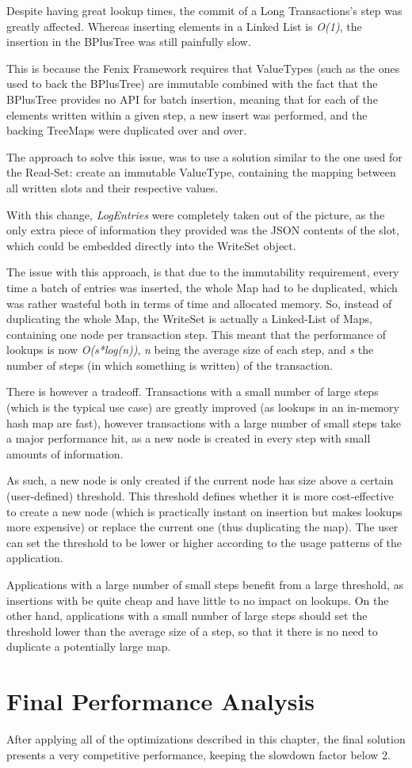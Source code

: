 Despite having great lookup times, the commit of a Long Transactions's
step was greatly affected. Whereas inserting elements in a Linked List
is {\it O(1)}, the insertion in the BPlusTree was still painfully
slow.

This is because the Fenix Framework requires that ValueTypes (such as
the ones used to back the BPlusTree) are immutable combined with the
fact that the BPlusTree provides no API for batch insertion, meaning
that for each of the elements written within a given step, a new
insert was performed, and the backing TreeMaps were duplicated over
and over. 

The approach to solve this issue, was to use a solution similar to the
one used for the Read-Set: create an immutable ValueType, containing
the mapping between all written slots and their respective values.

With this change, {\it LogEntries} were completely taken out of the
picture, as the only extra piece of information they provided was the
JSON contents of the slot, which could be embedded directly into the
WriteSet object.

The issue with this approach, is that due to the immutability
requirement, every time a batch of entries was inserted, the whole Map
had to be duplicated, which was rather wasteful both in terms of time
and allocated memory. So, instead of duplicating the whole Map, the
WriteSet is actually a Linked-List of Maps, containing one node per
transaction step. This meant that the performance of lookups is now
{\it O(s*log(n))}, {\it n} being the average size of each step, and
{\it s} the number of steps (in which something is written) of the
transaction.

There is however a tradeoff. Transactions with a small number of large
steps (which is the typical use case) are greatly improved (as lookups
in an in-memory hash map are fast), however transactions with a large
number of small steps take a major performance hit, as a new node is
created in every step with small amounts of information.

As such, a new node is only created if the current node has size above
a certain (user-defined) threshold. This threshold defines whether it
is more cost-effective to create a new node (which is practically
instant on insertion but makes lookups more expensive) or replace the
current one (thus duplicating the map). The user can set the threshold
to be lower or higher according to the usage patterns of the
application.

Applications with a large number of small steps benefit from a large
threshold, as insertions with be quite cheap and have little to no
impact on lookups. On the other hand, applications with a small number
of large steps should set the threshold lower than the average size of
a step, so that it there is no need to duplicate a potentially large
map. 

\section{Final Performance Analysis}

After applying all of the optimizations described in this chapter, the
final solution presents a very competitive performance, keeping the
slowdown factor below 2.
